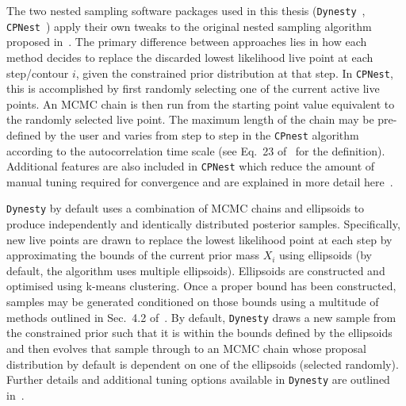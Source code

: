 %
%
The two nested sampling software packages used in this thesis 
(\texttt{Dynesty}~\cite{dynesty}, \texttt{CPNest}~\cite{cpnest}) 
apply their own tweaks to the original nested sampling algorithm 
proposed in~\cite{skilling2006}. The primary difference between 
approaches lies in how each method decides to replace 
the discarded lowest likelihood live point at each step/contour 
$i$, given the constrained prior distribution at that step. 
In \texttt{CPNest}, this is accomplished by first randomly selecting one of the 
current active live points. An \ac{MCMC} chain is then run from 
the starting point value equivalent to the randomly selected live 
point. The maximum length of the 
chain may be pre-defined by the user and varies from 
step to step in the \texttt{CPnest} algorithm according to the 
autocorrelation time scale (see Eq.~23 of~\cite{1409.7215} for 
the definition). Additional features are also included in \texttt{CPNest} which 
reduce the amount of manual tuning required for convergence and are explained 
in more detail here~\cite{1409.7215}.

%
%
\texttt{Dynesty} by default uses a combination of \ac{MCMC} chains and 
ellipsoids to produce independently and identically distributed posterior 
samples. Specifically, new live points are drawn to 
replace the lowest likelihood point at each step by approximating the 
bounds of the current prior mass $X_i$ using ellipsoids (by default, the 
algorithm uses multiple ellipsoids). Ellipsoids are constructed and 
optimised using k-means clustering. Once a proper bound has been 
constructed, samples may be generated conditioned on those bounds 
using a multitude of methods outlined in Sec.~4.2 of~\cite{dynesty}. By 
default, \texttt{Dynesty} draws a new sample from the constrained prior 
such that it is within the bounds defined by the ellipsoids and then 
evolves that sample through to an \ac{MCMC} chain whose proposal 
distribution by default is dependent on one of the ellipsoids (selected 
randomly). Further details and additional tuning options available in 
\texttt{Dynesty} are outlined in~\cite{dynesty}.


